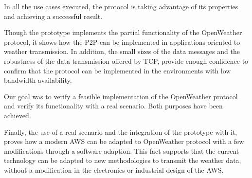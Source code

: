 In all the use cases executed, the protocol is taking advantage of its properties and achieving a successful result. 

Though the prototype implements the partial functionality of the OpenWeather protocol, it shows how the \gls{P2P} can be implemented in applications oriented to weather transmission. In addition, the small sizes of the data messages and the robustness of the data transmission offered by \gls{TCP}, provide enough confidence to confirm that the protocol can be implemented in the environments with low bandwidth availability.

Our goal was to verify a feasible implementation of the OpenWeather protocol and verify its functionality with a real scenario. Both purposes have been achieved.

Finally, the use of a real scenario and the integration of the prototype with it, proves how a modern \gls{AWS} can be adapted to OpenWeather protocol with a few modifications through a software adaption. This fact supports that the current technology can be adapted to new methodologies to transmit the weather data, without a modification in the electronics or industrial design of the \gls{AWS}.

\pagebreak
